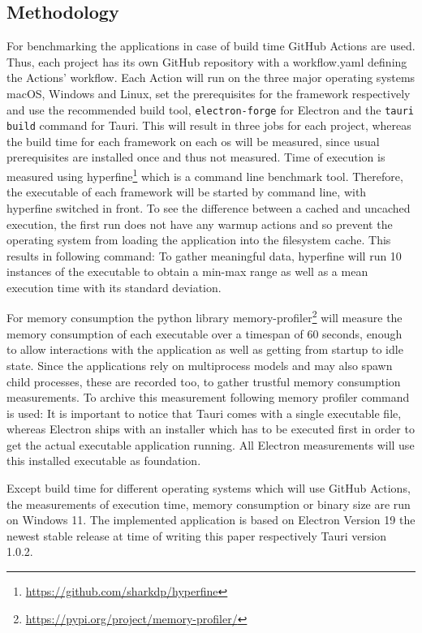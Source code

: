 \subsection{Methodology}
\label{subsec:method}
For benchmarking the applications in case of build time GitHub Actions are used.
Thus, each project has its own GitHub repository with a workflow.yaml defining the Actions' workflow.
Each Action will run on the three major operating systems macOS, Windows and Linux, set the prerequisites for the framework respectively and use the recommended build tool, \texttt{electron-forge} for Electron and the \texttt{tauri build} command for Tauri.
This will result in three jobs for each project, whereas the build time for each framework on each os will be measured, since usual prerequisites are installed once and thus not measured.
Time of execution is measured using hyperfine\footnote{\url{https://github.com/sharkdp/hyperfine}} which is a command line benchmark tool.
Therefore, the executable of each framework will be started by command line, with hyperfine switched in front.
To see the difference between a cached and uncached execution, the first run does not have any warmup actions and so prevent the operating system from loading the application into the filesystem cache.
This results in following command: 
To gather meaningful data, hyperfine will run 10 instances of the executable to obtain a min-max range as well as a mean execution time with its standard deviation.

For memory consumption the python library memory-profiler\footnote{\url{https://pypi.org/project/memory-profiler/}} will measure the memory consumption of each executable over a timespan of 60 seconds,
enough to allow interactions with the application as well as getting from startup to idle state.
Since the applications rely on multiprocess models and may also spawn child processes, these are recorded too, to gather trustful memory consumption measurements.
To archive this measurement following memory profiler command is used: 
It is important to notice that Tauri comes with a single executable file, whereas Electron ships with an installer which has to be executed first in order to get the actual executable application running.
All Electron measurements will use this installed executable as foundation.

Except build time for different operating systems which will use GitHub Actions, the measurements of execution time, memory consumption or binary size
are run on Windows 11.
The implemented application is based on Electron Version 19 the newest stable release at time of writing this paper respectively Tauri version 1.0.2.

